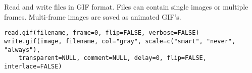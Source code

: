 \begin{Description}\relax
Read and write files in GIF format. Files can contain single images
or multiple frames. Multi-frame images are saved as animated GIF's.
\end{Description}
\begin{Usage}
\begin{verbatim}
read.gif(filename, frame=0, flip=FALSE, verbose=FALSE) 
write.gif(image, filename, col="gray", scale=c("smart", "never", "always"), 
    transparent=NULL, comment=NULL, delay=0, flip=FALSE, interlace=FALSE)
\end{verbatim}
\end{Usage}
